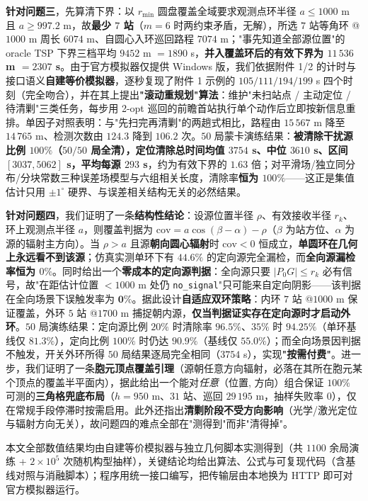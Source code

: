 \documentclass[11pt,a4paper]{ctexart}
\begin{document}
\textbf{针对问题三}，先算清下界：以 $r_{\min}$ 圆盘覆盖全域要求观测点环半径 $a\le1000$ m 且 $a\ge997.2$ m，故\textbf{最少 $7$ 站}（$m=6$ 时两约束矛盾，无解），所选 $7$ 站等角环 @$1000$ m 周长 $6074$ m、自圆心入环巡回路程 $7074$ m；"事先知道全部源位置"的 oracle TSP 下界三档平均 $9452$ m $=1890$ s，\textbf{并入覆盖环后的有效下界为 $11\,536$ m $=2307$ s}。由于官方模拟器仅提供 Windows 版，我们依据附件 1/2 的计时与接口语义\textbf{自建等价模拟器}，逐秒复现了附件 1 示例的 $105/111/194/199$ s 四个时刻（完全吻合），并在其上提出\textbf{"滚动重规划"算法}：维护"未扫站点 / 主动定位 / 待清剿"三类任务，每步用 2-opt 巡回的前瞻首站执行单个动作后立即按新信息重排。单因子对照表明：与"先扫完再清剿"的两趟式相比，路程由 $15\,567$ m 降至 $14\,765$ m、检测次数由 $124.3$ 降到 $106.2$ 次。$50$ 局蒙卡演练结果：\textbf{被清除干扰源比例 $100\%$（$50/50$ 局全清），定位清除总时间均值 $3754$ s、中位 $3610$ s、区间 $[3037,5062]$ s，平均每源 $293$ s}，约为有效下界的 $1.63$ 倍；对平滑场/独立同分布/分块常数三种误差场模型与六组相关长度，清除率\textbf{恒为 $100\%$}——这正是集值估计只用 $\pm1^\circ$ 硬界、与误差相关结构无关的必然结果。

\textbf{针对问题四}，我们证明了一条\textbf{结构性结论}：设源位置半径 $\rho$、有效接收半径 $r_k$、环上观测点半径 $a$，则覆盖判据为 $\mathrm{cov}=a\cos(\beta-\alpha)-\rho$（$\beta$ 为站方位、$\alpha$ 为源的辐射主方向）。当 $\rho>a$ 且源\textbf{朝向圆心辐射}时 $\mathrm{cov}<0$ 恒成立，\textbf{单圆环在几何上永远看不到该源}；仿真实测单环下有 $44.6\%$ 的定向源完全漏检，而\textbf{全向源漏检率恒为 $0\%$}。同时给出一个\textbf{零成本的定向源判据}：全向源只要 $|P_0G|\le r_k$ 必有信号，故"在距估计位置 $<1000$ m 处仍 \texttt{no\_signal}"只可能来自定向阴影——该判据在全向场景下误触发率为 $\mathbf{0\%}$。据此设计\textbf{自适应双环策略}：内环 $7$ 站 @$1000$ m 保证覆盖，外环 $5$ 站 @$1700$ m 捕捉朝内源，\textbf{仅当判据证实存在定向源时才启动外环}。$50$ 局演练结果：定向源比例 $20\%$ 时清除率 $96.5\%$、$35\%$ 时 $94.25\%$（单环基线仅 $81.3\%$），定向比例 $100\%$ 时仍达 $90.9\%$（基线仅 $55.0\%$）；而全向场景因判据不触发，开关外环所得 $50$ 局结果逐局完全相同（$3754$ s），实现\textbf{"按需付费"}。进一步，我们证明了一条\textbf{胞元顶点覆盖引理}（源朝任意方向辐射，必落在其所在胞元某个顶点的覆盖半平面内），据此给出一个能对\emph{任意}（位置, 方向）组合保证 $100\%$ 可测的\textbf{三角格兜底布局}（$h=950$ m、$31$ 站、巡回 $29\,195$ m，抽样失败率 $0$），仅在常规手段停滞时按需启用。此外还指出\textbf{清剿阶段不受方向影响}（光学/激光定位与辐射方向无关），故问题四的难点全部在"测得到"而非"清得掉"。

本文全部数值结果均由自建等价模拟器与独立几何脚本实测得到（共 $1100$ 余局演练 + $2\times10^5$ 次随机构型抽样），关键结论均给出算法、公式与可复现代码（含基线对照与消融脚本）；程序用统一接口编写，把传输层由本地换为 HTTP 即可对官方模拟器运行。
\end{document}
